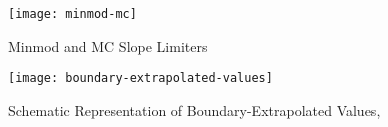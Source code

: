 \begin{figure}[h]
        \centering
        \texttt{[image: minmod-mc]}
        \caption{Minmod and MC Slope Limiters \cite{rezzolla}}
\end{figure}
\begin{figure}[h]
        \centering
        \texttt{[image: boundary-extrapolated-values]}
        \caption{Schematic Representation of Boundary-Extrapolated Values, \cite{rezzolla}}
\end{figure}
